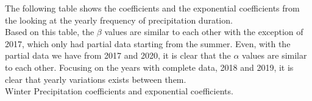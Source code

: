 \documentclass[11pt]{report}
\begin{document}
 The following table shows
the coefficients and the exponential coefficients from the looking at
the yearly frequency of precipitation duration. \\

Based on this table, the $\beta$ values are similar to each other with
the exception of 2017, which only had partial data starting from the
summer. Even, with the partial data we have from 2017 and 2020, it is
clear that the $\alpha$ values are similar to each other. Focusing on
the years with complete data, 2018 and 2019, it is clear that yearly
variations exists between them.  \\ Winter Precipitation coefficients
and exponential coefficients. \\
\end{document}
